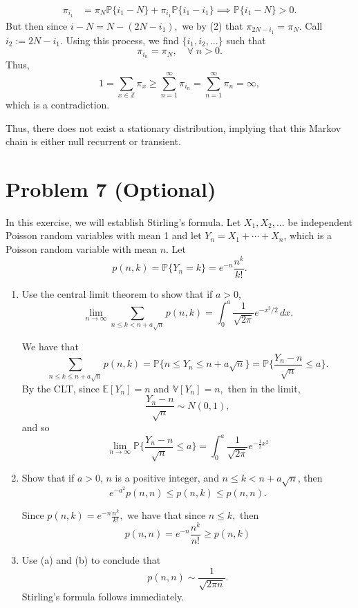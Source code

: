 \documentclass[11pt]{article}
\newcommand{\bbE}{\mathbb{E}}
\newcommand{\bbP}{\mathbb{P}}
\newcommand{\bbV}{\mathbb{V}}
\newcommand{\bbZ}{\mathbb{Z}}
\begin{document}
\begin{solution}
\begin{align*}
    \pi_{i_1} &= \pi_{N}\bbP\{i_1 - N\} + \pi_{i_1}\bbP\{i_1-i_1\} \implies \bbP\{i_1-N\} >0.
\end{align*}
But then since $i- N = N - (2N - i_1),$ we by (2) that $\pi_{2N - i_1}  = \pi_N.$ Call $i_2 := 2N-i_1.$ Using this process, we find $\{i_1, i_2, \dots\}$ such that 
\[\pi_{i_n}= \pi_N, \quad \forall \;n >0.\] Thus, 
\[1 = \sum_{x\in \bbZ}\pi_x \geq \sum_{n=1}^\infty \pi_{i_n} = \sum_{n=1}^\infty \pi_n = \infty,\] which is a contradiction. 

Thus, there does not exist a stationary distribution, implying that this Markov chain is either null recurrent or transient. 
\end{solution}

\newpage

\section*{Problem 7 (Optional)}
In this exercise, we will establish Stirling's formula. Let \(X_{1},X_{2},\ldots\) be independent Poisson random variables with mean 1 and let \(Y_{n}=X_{1}+\cdots+X_{n}\), which is a Poisson random variable with mean \(n\). Let
\[
p(n,k)=\mathbb{P}\{Y_{n}=k\}=e^{-n}\frac{n^{k}}{k!}.
\]

\begin{enumerate}[label=(\alph*)]
    \item Use the central limit theorem to show that if \(a>0\),
    \[
    \lim_{n\to\infty}\sum_{n\leq k<n+a\sqrt{n}}p(n,k)=\int_{0}^{a}\frac{1}{\sqrt{2\pi}}e^{-x^{2}/2}\,dx.
    \]
\begin{solution}
    We have that 
    \[\sum_{n \leq k \leq n + a \sqrt{n}}p(n,k) = \bbP\{n \leq Y_n \leq n + a\sqrt{n}\} = \bbP\{\frac{Y_n - n}{\sqrt{n}} \leq a\}.\] By the CLT, since $\bbE[Y_n] = n$ and $\bbV[Y_n] = n,$ then in the limit,
    \[\frac{Y_n - n}{\sqrt{n}}\sim N(0,1),\] and so
    \[\lim_{n\to \infty} \bbP\{\frac{Y_n - n}{\sqrt{n}} \leq a\} = \int_0^a \frac{1}{\sqrt{2\pi}}e^{-\frac{1}{2}x^2}\]
\end{solution}
    
    \item Show that if \(a>0\), \(n\) is a positive integer, and \(n\leq k<n+a\sqrt{n}\), then
    \[
    e^{-a^{2}}p(n,n)\leq p(n,k)\leq p(n,n).
    \]
\begin{solution}
    Since $p(n,k) = e^{-n}\frac{n^k}{k!},$ we have that since $n\leq k,$ then
    \[p(n,n) = e^{-n}\frac{n^k}{n!} \geq p(n,k)\]
\end{solution}
    \item Use (a) and (b) to conclude that
    \[
    p(n,n)\sim\frac{1}{\sqrt{2\pi n}}.
    \]
    Stirling's formula follows immediately.
\end{enumerate}
\end{document}
